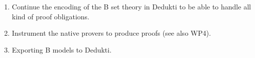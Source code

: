 





\begin{enumerate}

  \item Continue the encoding of the B set theory in Dedukti to be
  able to handle all kind of proof obligations.

  \item Instrument the native provers to produce proofs (see also WP4).

  \item Exporting B models to Dedukti.
\end{enumerate}



